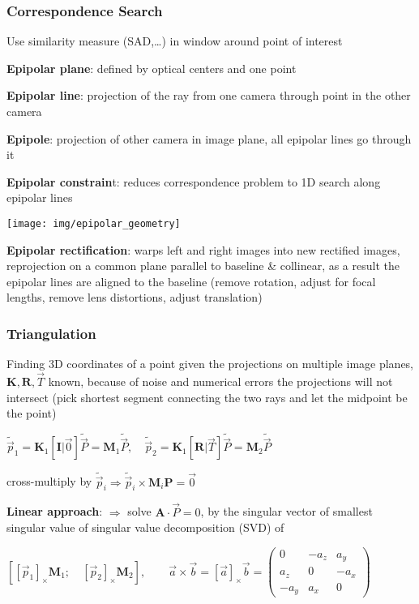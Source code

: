 \documentclass[fontsize=6pt]{scrartcl}
\newcommand{\mat}[1]{\mathbf{#1}}
\begin{document}
\begin{multicols*}{4}
\subsubsection*{Correspondence Search}
Use similarity measure (SAD,…) in window around point of interest

\textbf{Epipolar plane}: defined by optical centers and one point

\textbf{Epipolar line}: projection of the ray from one camera through point in the other camera

\textbf{Epipole}: projection of other camera in image plane, all epipolar lines go through it

\textbf{Epipolar constrain}t: reduces correspondence problem to 1D search along epipolar lines

\begin{minipage}{0.6\linewidth}
\texttt{[image: img/epipolar\_geometry]}
\end{minipage}
\begin{minipage}{0.4\linewidth}
\textbf{Epipolar rectification}:
warps left and right images into new rectified images, reprojection on a common plane parallel to baseline \& collinear, as a result the epipolar lines are aligned to the baseline (remove rotation, adjust for focal lengths, remove lens distortions, adjust translation)
\end{minipage}


\subsubsection*{Triangulation}

Finding 3D coordinates of a point given the projections on multiple image planes, $\mat K,\mat R,\vec T$ known, because of noise and numerical errors the projections will not intersect (pick shortest segment connecting the two rays and let the midpoint be the point)

$\tilde{\vec p}_1 = \mat K_1 [\mat I | \vec 0] \tilde{\vec P} = \mat M_1 \tilde{\vec P}, \quad \tilde{\vec p}_2 = \mat K_1 [\mat R | \vec T] \tilde{\vec P} = \mat M_2 \tilde{\vec P}$

cross-multiply by $\tilde{\vec p}_i \Rightarrow \tilde{\vec{p}}_i \times \mat M_i \mat P = \vec 0$

\textbf{Linear approach}: $\Rightarrow$ solve $\mat A \cdot \vec P= 0$, by the singular vector of smallest singular value of singular value decomposition (SVD) of 

$\left[\left[\vec p_1\right]_\times \mat M_1; \quad \left[\vec p_2\right]_\times \mat M_2\right], \qquad \vec a \times \vec b = \left[\vec a\right]_\times \vec b = \left(\begin{smallmatrix}
0 & -a_z & a_y\\
a_z & 0 & -a_x\\
-a_y & a_x & 0
\end{smallmatrix}\right)$


\end{multicols*}
\end{document}
